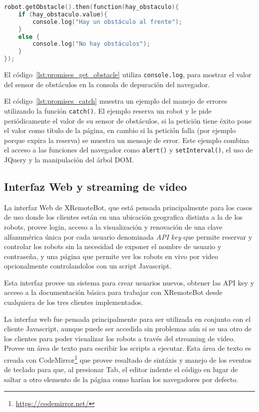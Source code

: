 \begin{lstlisting}[language=C,
caption={Implementación de \texttt{getObstacle()} con ``promesas''},
label=lst:promises_get_obstacle]
robot.getObstacle().then(function(hay_obstaculo){
    if (hay_obstaculo.value){
        console.log("Hay un obstáculo al frente");
    }
    else {
        console.log("No hay obstáculos");
    }
});
\end{lstlisting}

El código~\ref{lst:promises_get_obstacle} utiliza \texttt{console.log},
para mostrar el valor del sensor de obstáculos en la consola de depuración
del navegador.






El código~\ref{lst:promises_catch} muestra un ejemplo del manejo de errores
utilizando la función \texttt{catch()}. El ejemplo reserva un robot y
le pide periódicamente el valor de su sensor de obstáculos, si la petición tiene
éxito pone el valor como título de la página, en cambio si la petición falla
(por ejemplo porque expira la reserva) se muestra un mensaje de error.
Este ejemplo combina el acceso
a las funciones del navegador como \texttt{alert()} y \texttt{setInterval()},
el uso de JQuery y la manipulación del árbol DOM.


\subsection{Interfaz Web y streaming de video}

La interfaz Web de XRemoteBot, que está pensada principalmente para los casos
de uso donde los clientes están en una ubicación geografica distinta a la de
los robots, provee login, acceso a la visualización y renovación de una
clave alfanumérica única por cada usuario denominada \textit{API key} que
permite reservar y controlar los robots sin la necesidad de exponer el nombre
de usuario y contraseña, y una página que permite ver los robots en vivo por
video opcionalmente controlandolos con un script Javascript.

Esta interfaz provee un sistema para crear usuarios nuevos, obtener las
API key y acceso a la documentación básica para trabajar con XRemoteBot
desde cualquiera de los tres clientes implementados.

La interfaz web fue pensada principalmente para ser utilizada en conjunto
 con el cliente
Javascript, aunque puede ser accedida sin problemas aún si se usa
otro de los clientes para poder visualizar los robots a través del
streaming de video. Provee un área de texto para escribir los scripts a
ejecutar.
Esta área de texto es creada con
CodeMirror\footnote{\url{https://codemirror.net/}}
que provee resaltado de sintáxis y manejo de los eventos de teclado para
que, al presionar Tab, el editor indente el código en lugar de saltar a otro
elemento de la página como harían los navegadores por defecto.


